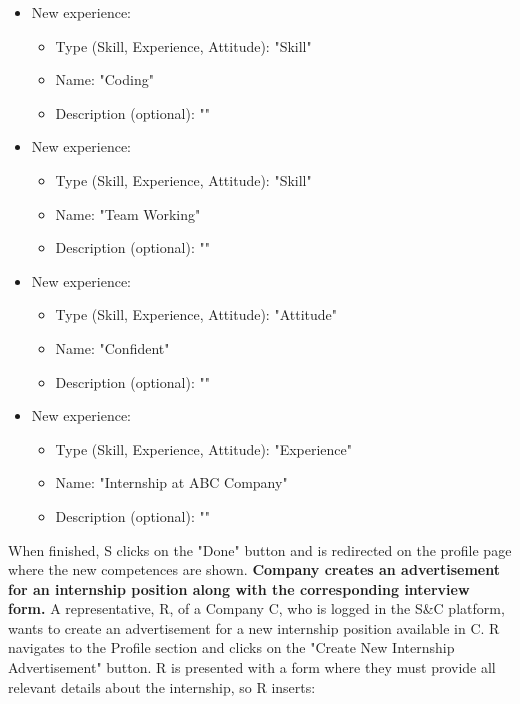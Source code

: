 \begin{itemize}
    \item New experience:
    \begin{itemize}
        \item Type (Skill, Experience, Attitude): "Skill"
        \item Name: "Coding"
        \item Description (optional): ""
    \end{itemize}
    \item New experience:
    \begin{itemize}
        \item Type (Skill, Experience, Attitude): "Skill"
        \item Name: "Team Working"
        \item Description (optional): ""
    \end{itemize}
    \item New experience:
    \begin{itemize}
        \item Type (Skill, Experience, Attitude): "Attitude"
        \item Name: "Confident"
        \item Description (optional): ""
    \end{itemize}
    \item New experience:
    \begin{itemize}
        \item Type (Skill, Experience, Attitude): "Experience"
        \item Name: "Internship at ABC Company"
        \item Description (optional): ""
    \end{itemize}
\end{itemize}
When finished, S clicks on the "Done" button and is redirected on the profile page where the new competences are shown.
\newline\newline
\textbf{Company creates an advertisement for an internship position along with the corresponding interview form.}\newline
A representative, R, of a Company C, who is logged in the S\&C platform, wants to create an advertisement for a new internship position available in C. R navigates to the Profile section and clicks on the "Create New Internship Advertisement" button. R is presented with a form where they must provide all relevant details about the internship, so R inserts:
